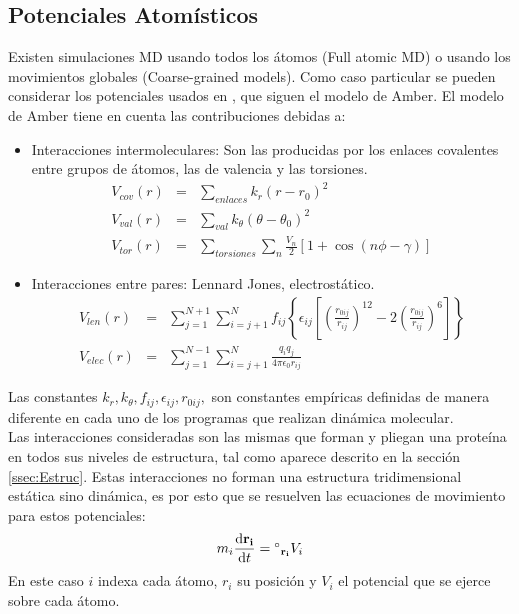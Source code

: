\subsection{Potenciales Atom\'{i}sticos}
Existen simulaciones MD usando todos los \'{a}tomos (Full atomic MD) o usando los movimientos globales (Coarse-grained models). Como caso particular se pueden considerar los potenciales usados en \cite{Amber2016}, que siguen el modelo de Amber. El modelo de Amber tiene en cuenta las contribuciones debidas a:
 \begin{itemize}
\item Interacciones intermoleculares: Son las producidas por los enlaces covalentes entre grupos de \'{a}tomos, las de valencia y las torsiones.
\begin{eqnarray}
V_{cov}(r)&=&\sum_{enlaces}k_r\left(r-r_0\right)^2\\
V_{val}(r)&=&\sum_{val}k_\theta\left(\theta-\theta_0\right)^2\\
V_{tor}(r)&=&\sum_{torsiones}\sum_{n}\frac{V_n}{2}\left[1+\cos(n\phi-\gamma)\right]
\end{eqnarray}
\item Interacciones entre pares: Lennard Jones, electrost\'{a}tico.
\begin{eqnarray}
V_{len}(r)&=&\sum_{j=1}^{N+1}\sum_{i=j+1}^N f_{ij}\left\{\epsilon_{ij}\left[\left(\frac{r_{0ij}}{r_{ij}}\right)^{12}-2\left(\frac{r_{0ij}}{r_{ij}}\right)^6\right]\right\}\\
V_{elec}(r)&=&\sum_{j=1}^{N-1}\sum_{i=j+1}^{N}\frac{q_iq_j}{4\pi\epsilon_0r_{ij}}
\end{eqnarray}
\end{itemize}
Las constantes $k_r,k_\theta,f_{ij},\epsilon_{ij},r_{0ij},$ son constantes emp\'{i}ricas definidas de manera diferente en cada uno de los programas que realizan din\'{a}mica molecular.\\

Las interacciones consideradas son las mismas que forman y pliegan una prote\'{i}na  en todos sus niveles de estructura, tal como aparece descrito en la secci\'{o}n \ref{ssec:Estruc}. Estas interacciones no forman una estructura tridimensional est\'{a}tica sino din\'{a}mica, es por esto que se resuelven las ecuaciones de movimiento para estos potenciales:
\begin{equation}\label{eq:48}
m_i\frac{\mathrm{d}\mathbf{r_i}}{\mathrm{d}t}=\mbox{$^{\circ}$}_\mathbf{r_i} V_i
\end{equation}
En este caso $i$ indexa cada \'{a}tomo, $r_i$ su posici\'{o}n y $V_i$ el potencial que se ejerce sobre cada \'{a}tomo.\\

